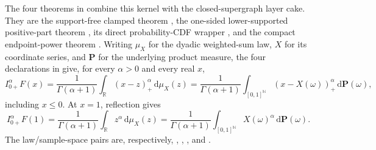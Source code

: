 \documentclass[11pt,oneside]{article}
\theoremstyle{definition}
\theoremstyle{remark}
\newcommand{\R}{\mathbb R}
\newcommand{\N}{\mathbb N}
\newcommand{\dd}{\,\mathrm d}
\newcommand{\1}{\mathbf 1}
\begin{document}
\begin{statusbox}
The four theorems in  combine this kernel with the
closed-supergraph layer cake.  They are the support-free clamped theorem
, the one-sided
lower-supported positive-part theorem
, its direct
probability-CDF wrapper , and the
compact endpoint-power theorem
.
Writing \(\mu_X\) for the dyadic weighted-sum law, \(X\) for its coordinate series, and
\(\mathbf P\) for the underlying product measure, the
four declarations in  give, for every \(\alpha>0\) and
every real \(x\),
\begin{equation}
 I_{0+}^{\alpha}F(x)
 =\frac{1}{\Gamma(\alpha+1)}\int_{\R}(x-z)_+^\alpha\dd\mu_X(z)
 =\frac{1}{\Gamma(\alpha+1)}
   \int_{[0,1]^{\N}}(x-X(\omega))_+^\alpha\dd\mathbf P(\omega),
 \label{p0:eq:fabius-fractional-stopped-power}
\end{equation}
including \(x\le0\).  At \(x=1\), reflection gives
\begin{equation}
 I_{0+}^{\alpha}F(1)
 =\frac{1}{\Gamma(\alpha+1)}\int_{\R}z^\alpha\dd\mu_X(z)
 =\frac{1}{\Gamma(\alpha+1)}
   \int_{[0,1]^{\N}}X(\omega)^\alpha\dd\mathbf P(\omega).
 \label{p0:eq:fabius-fractional-endpoint-moment}
\end{equation}
The law/sample-space pairs are, respectively,
,
,
,
and
.


\end{statusbox}
\end{document}
